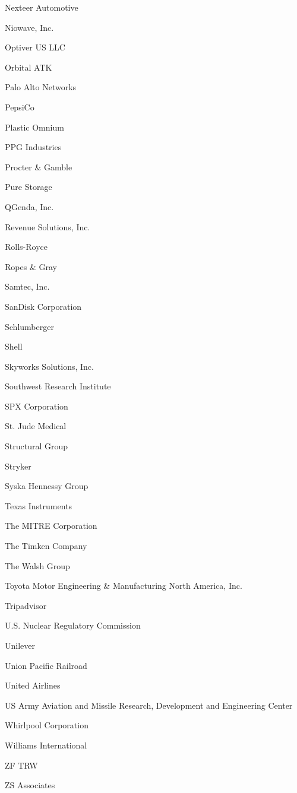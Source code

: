 \documentclass[twoside]{article}
\begin{document}
\begin{center}
\begin{multicols}{5}
\begin{FlushLeft}
\begin{compactitem}
\item Nexteer Automotive
\item Niowave, Inc.
\item Optiver US LLC
\item Orbital ATK
\item Palo Alto Networks
\item PepsiCo
\item Plastic Omnium
\item PPG Industries
\item Procter \& Gamble
\item Pure Storage
\item QGenda, Inc.
\item Revenue Solutions, Inc.
\item Rolls-Royce
\item Ropes \& Gray
\item Samtec, Inc.
\item SanDisk Corporation
\item Schlumberger
\item Shell
\item Skyworks Solutions, Inc.
\item Southwest Research Institute
\item SPX Corporation
\item St. Jude Medical
\item Structural Group
\item Stryker
\item Syska Hennessy Group
\item Texas Instruments
\item The MITRE Corporation
\item The Timken Company
\item The Walsh Group
\item Toyota Motor Engineering \& Manufacturing North America, Inc.
\item Tripadvisor
\item U.S. Nuclear Regulatory Commission
\item Unilever
\item Union Pacific Railroad
\item United Airlines
\item US Army Aviation and Missile Research, Development and Engineering Center
\item Whirlpool Corporation
\item Williams International
\item ZF TRW
\item ZS Associates

\end{compactitem}
\end{FlushLeft}
\end{multicols}
\end{center}
\end{document}
